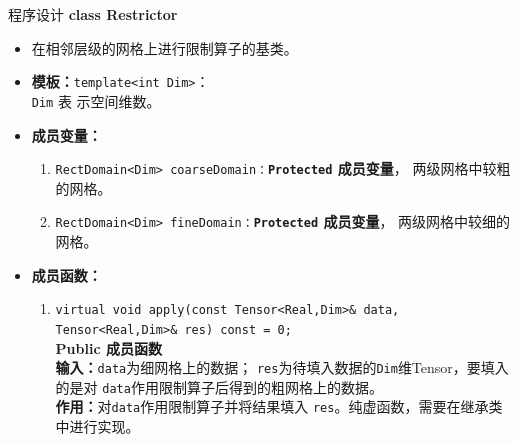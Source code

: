 \documentclass{beamer}
\begin{document}
\begin{frame}{程序设计}
\textbf{\large class Restrictor}
\begin{itemize}
    \item 在相邻层级的网格上进行限制算子的基类。
    \item \textbf{模板：}\texttt{template<int Dim>}：\\\texttt{Dim} 表
      示空间维数。
       \item \textbf{成员变量：}
        \begin{enumerate}[(1)]
            \item \texttt{RectDomain<Dim>
                coarseDomain：}\textbf{\texttt{Protected}  成员变量}，
              两级网格中较粗的网格。
              \item \texttt{RectDomain<Dim>
                fineDomain：}\textbf{\texttt{Protected}  成员变量}，
              两级网格中较细的网格。
        \end{enumerate}
    \item \textbf{成员函数：}
            \begin{enumerate}[(1)]
            \item \texttt{virtual void apply(const Tensor<Real,Dim>\& data,
                    Tensor<Real,Dim>\& res) const = 0;}\\
                  \textbf{Public 成员函数}\\
                \textbf{输入：}\texttt{data}为细网格上的数据；
                \texttt{res}为待填入数据的\texttt{Dim}维Tensor，要填入的是对
                \texttt{data}作用限制算子后得到的粗网格上的数据。\\
                \textbf{作用：}对\texttt{data}作用限制算子并将结果填入
                \texttt{res}。纯虚函数，需要在继承类中进行实现。
            \end{enumerate}
          \end{itemize}


\end{frame}
\end{document}
